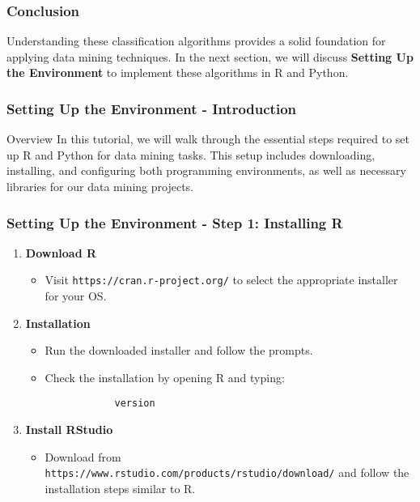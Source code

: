 \documentclass[aspectratio=169]{beamer}
\begin{document}
\begin{frame}[fragile]
    \frametitle{Conclusion}
    Understanding these classification algorithms provides a solid foundation for applying data mining techniques. 
    In the next section, we will discuss \textbf{Setting Up the Environment} to implement these algorithms in R and Python.
\end{frame}

\begin{frame}[fragile]
    \frametitle{Setting Up the Environment - Introduction}
    \begin{block}{Overview}
    In this tutorial, we will walk through the essential steps required to set up R and Python for data mining tasks. 
    This setup includes downloading, installing, and configuring both programming environments, as well as necessary libraries for our data mining projects.
    \end{block}
\end{frame}

\begin{frame}[fragile]
    \frametitle{Setting Up the Environment - Step 1: Installing R}
    \begin{enumerate}
        \item \textbf{Download R}
        \begin{itemize}
            \item Visit \texttt{https://cran.r-project.org/} to select the appropriate installer for your OS.
        \end{itemize}
        
        \item \textbf{Installation}
        \begin{itemize}
            \item Run the downloaded installer and follow the prompts.
            \item Check the installation by opening R and typing:
            \begin{lstlisting}
            version
            \end{lstlisting}
        \end{itemize}
        
        \item \textbf{Install RStudio}
        \begin{itemize}
            \item Download from \texttt{https://www.rstudio.com/products/rstudio/download/} and follow the installation steps similar to R.
        \end{itemize}
    \end{enumerate}
\end{frame}
\end{document}
